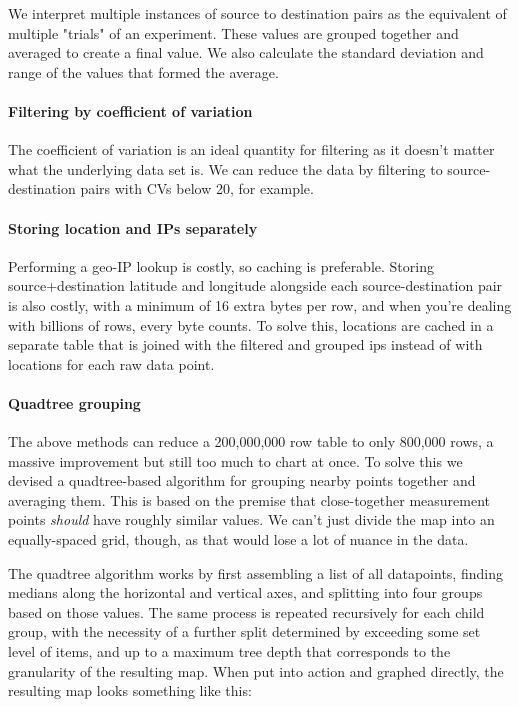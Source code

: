 We interpret multiple instances of source to destination pairs as the equivalent of multiple "trials" of an experiment. These values are grouped together and averaged to create a final value. We also calculate the standard deviation and range of the values that formed the average.

\paragraph{Filtering by coefficient of variation}

The coefficient of variation is an ideal quantity for filtering as it doesn't matter what the underlying data set is. We can reduce the data by filtering to source-destination pairs with CVs below 20, for example.

\paragraph{Storing location and IPs separately}

Performing a geo-IP lookup is costly, so caching is preferable. Storing source+destination latitude and longitude alongside each source-destination pair is also costly, with a minimum of 16 extra bytes per row, and when you're dealing with billions of rows, every byte counts. To solve this, locations are cached in a separate table that is joined with the filtered and grouped \glspl{ip} instead of with locations for each raw data point.

\paragraph{Quadtree grouping}

The above methods can reduce a \textapprox{}200,000,000 row table to only \textapprox{}800,000 rows, a massive improvement but still too much to chart at once. To solve this we devised a quadtree-based algorithm for grouping nearby points together and averaging them. This is based on the premise that close-together measurement points \textit{should} have roughly similar values. We can't just divide the map into an equally-spaced grid, though, as that would lose a lot of nuance in the data.

The quadtree algorithm works by first assembling a list of all datapoints, finding medians along the horizontal and vertical axes, and splitting into four groups based on those values. The same process is repeated recursively for each child group, with the necessity of a further split determined by exceeding some set level of items, and up to a maximum tree depth that corresponds to the granularity of the resulting map. When put into action and graphed directly, the resulting map looks something like this:

